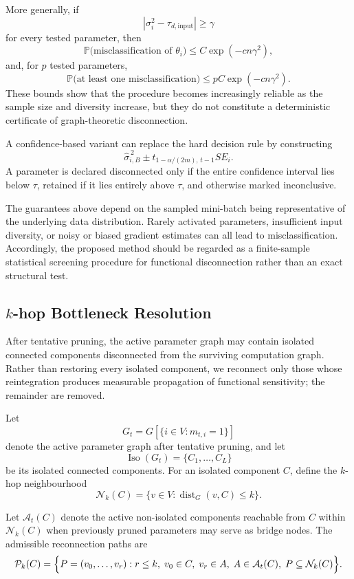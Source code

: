 \documentclass{article}
\theoremstyle{definition}
\theoremstyle{remark}
\begin{document}
More generally, if
\[
|\sigma_i^2-\tau_{d,\mathrm{input}}|\ge\gamma
\]
for every tested parameter, then
\[
\mathbb P
\bigl(
\text{misclassification of }\theta_i
\bigr)
\le
C\exp(-cn\gamma^2),
\]
and, for \(p\) tested parameters,
\[
\mathbb P
\bigl(
\text{at least one misclassification}
\bigr)
\le
pC\exp(-cn\gamma^2).
\]
These bounds show that the procedure becomes increasingly reliable as the sample size and diversity increase, but they do not constitute a deterministic certificate of graph-theoretic disconnection.

A confidence-based variant can replace the hard decision rule by constructing
\[
\widehat{\sigma}_{i,B}^{\,2}
\pm
t_{1-\alpha/(2m),\,t-1}
SE_i.
\]
A parameter is declared disconnected only if the entire confidence interval lies below \(\tau\), retained if it lies entirely above \(\tau\), and otherwise marked inconclusive.

The guarantees above depend on the sampled mini-batch being representative of the underlying data distribution. Rarely activated parameters, insufficient input diversity, or noisy or biased gradient estimates can all lead to misclassification. Accordingly, the proposed method should be regarded as a finite-sample statistical screening procedure for functional disconnection rather than an exact structural test.

\subsection{$k$-hop Bottleneck Resolution}
\label{subsec:khop}

After tentative pruning, the active parameter graph may contain isolated connected components disconnected from the surviving computation graph. Rather than restoring every isolated component, we reconnect only those whose reintegration produces measurable propagation of functional sensitivity; the remainder are removed.

Let
\[
G_t
=
G\!\left[\{i\in V:m_{t,i}=1\}\right]
\]
denote the active parameter graph after tentative pruning, and let
\[
\operatorname{Iso}(G_t)
=
\{C_1,\ldots,C_L\}
\]
be its isolated connected components. For an isolated component $C$, define the $k$-hop neighbourhood
\[
\mathcal N_k(C)
=
\{v\in V:\operatorname{dist}_G(v,C)\le k\}.
\]

Let $\mathcal A_t(C)$ denote the active non-isolated components reachable from $C$ within $\mathcal N_k(C)$ when previously pruned parameters may serve as bridge nodes. The admissible reconnection paths are
\[
\mathcal P_k(C)
=
\Bigl\{
P=(v_0,\ldots,v_r):
r\le k,\;
v_0\in C,\;
v_r\in A,\;
A\in\mathcal A_t(C),\;
P\subseteq\mathcal N_k(C)
\Bigr\}.
\]
\end{document}
